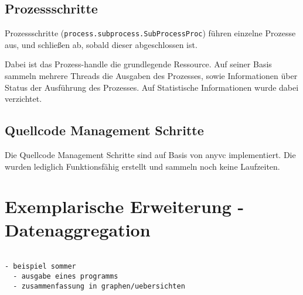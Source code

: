 \subsection{Prozessschritte}

Prozessschritte (\verb|process.subprocess.SubProcessProc|)
führen einzelne Prozesse aus, und schließen ab, sobald dieser
abgeschlossen ist.

Dabei ist das Prozess-handle die grundlegende Ressource.
Auf seiner Basis sammeln mehrere Threads die Ausgaben des Prozesses, sowie Informationen über Status der Ausführung des Prozesses.
Auf Statistische Informationen wurde dabei verzichtet.

\subsection{Quellcode Management Schritte}

Die Quellcode Management Schritte sind auf Basis von anyvc \cite{anyvc:website} implementiert. Die wurden lediglich Funktionsfähig erstellt und sammeln noch keine Laufzeiten.

\section{Exemplarische Erweiterung - Datenaggregation}

 
\begin{verbatim}

- beispiel sommer
  - ausgabe eines programms
  - zusammenfassung in graphen/uebersichten

\end{verbatim}

